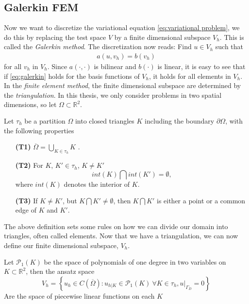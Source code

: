 \documentclass[../Main/main.tex]{subfiles}
\begin{document}
	\subsection{Galerkin FEM} \label{sec:galerkin_fem}

	Now we want to discretize the variational equation \eqref{eq:variational problem}, we do this by replacing the test space $V$ by a finite dimensional subspace $V_h$. This is called the \emph{Galerkin method}. The discretization now reads: Find $u \in V_h$ such that 
	\begin{equation}\label{eq:galerkin}
		\begin{gathered}
			a(u,v_h) = b(v_h) 
		\end{gathered}
	\end{equation}
	for all $v_h$ in $V_h$.
	Since $a(\cdot,\cdot)$ is bilinear and $b(\cdot)$ is linear, it is easy to see that if \eqref{eq:galerkin} holds for the basis functions of $V_h$, it holds for all elements in $V_h$. In the \emph{finite element method}, the finite dimensional subspace are determined by the \emph{triangulation}. In this thesis, we only consider problems in two spatial dimensions, so let $\Omega \subset \mathbb{R}^2$. 
	\begin{definition}
		Let $\tau_h$ be a partition $\Omega$ into closed triangles $K$ including the boundary $\partial \Omega$, with the following properties
		\begin{itemize}
			\item[\textbf{(T1)}] $\overline{\Omega} = \bigcup_{K\in \tau_h}K$ .
			\item[\textbf{(T2)}] For $K$, $K' \in \tau_h$, $K \neq K'$ \begin{equation*}
				int(K) \bigcap int(K')=\emptyset,
			\end{equation*} 
			where $int(K)$ denotes the interior of $K$.
			\item[\textbf{(T3)}] If $K\neq K'$, but $K\bigcap K' \neq \emptyset$, then $K\bigcap K'$ is either a point or a common edge of $K$ and $K'$.
			
		\end{itemize}
	\end{definition}
	The above definition sets some rules on how we can divide our domain into triangles, often called elements.
	Now that we have a triangulation, we can now define our finite dimensional subspace, $V_h$.
	\begin{definition}\label{def:linear ansatz}
		Let $\mathcal{P}_1(K)$ be the space of polynomials of one degree in two variables on $K\subset \mathbb{R}^2$, then the ansatz space
		\begin{equation*}
			V_h = \left \{ u_h \in C(\overline{\Omega}) : u_{h|K} \in \mathcal{P}_1(K) \ \forall K \in \tau_h, u|_{\Gamma_D} = 0  \right \}
		\end{equation*}
		Are the space of piecewise linear functions on each $K$
	\end{definition}
\end{document}

